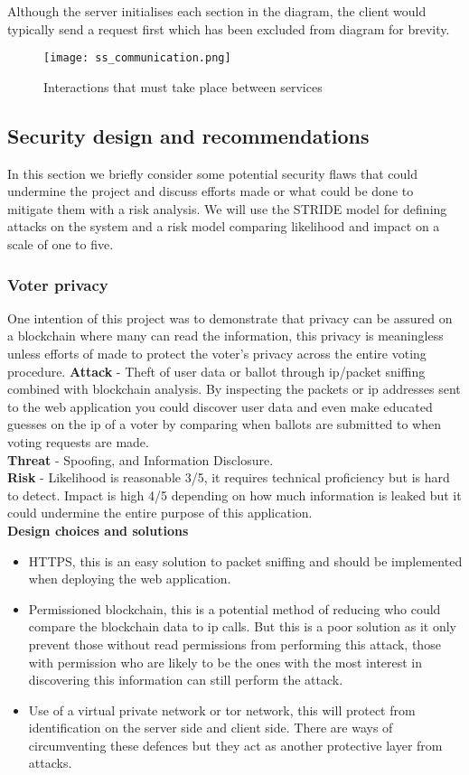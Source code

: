 \documentclass{entcs}
\begin{document}
Although the server initialises each section in the diagram, the client would typically send a request first which has been excluded from diagram for brevity. 

\begin{figure}[h!]
    \centering
    \texttt{[image: ss\_communication.png]}
    \caption{Interactions that must take place between services}
    \label{fig:communication}
\end{figure}

\subsection{Security design and recommendations} \label{sec: security design}
In this section we briefly consider some potential security flaws that could undermine the project and discuss efforts made or what could be done to mitigate them with a risk analysis. We will use the STRIDE model \cite{STRIDE} for defining attacks on the system and a risk model comparing likelihood and impact on a scale of one to five.

\subsubsection{Voter privacy}
One intention of this project was to demonstrate that privacy can be assured on a blockchain where many can read the information, this privacy is meaningless unless efforts of made to protect the voter's privacy across the entire voting procedure. 
\textbf{Attack} - Theft of user data or ballot through ip/packet sniffing \cite{ansari2002packet} combined with blockchain analysis. By inspecting the packets or ip addresses sent to the web application you could discover user data and even make educated guesses on the ip of a voter by comparing when ballots are submitted to when voting requests are made. \\
\textbf{Threat} - Spoofing, and Information Disclosure. \\
\textbf{Risk} - Likelihood is reasonable 3/5, it requires technical proficiency but is hard to detect. Impact is high 4/5 depending on how much information is leaked but it could undermine the entire purpose of this application.\\
\textbf{Design choices and solutions}
\begin{itemize}
    \item HTTPS, this is an easy solution to packet sniffing and should be implemented when deploying the web application.
    \item Permissioned blockchain, this is a potential method of reducing who could compare the blockchain data to ip calls. But this is a poor solution as it only prevent those without read permissions from performing this attack, those with permission who are likely to be the ones with the most interest in discovering this information can still perform the attack.
    \item Use of a virtual private network or tor network, this will protect from identification on the server side and client side. There are ways of circumventing these defences but they act as another protective layer from attacks.
\end{itemize}
\end{document}
